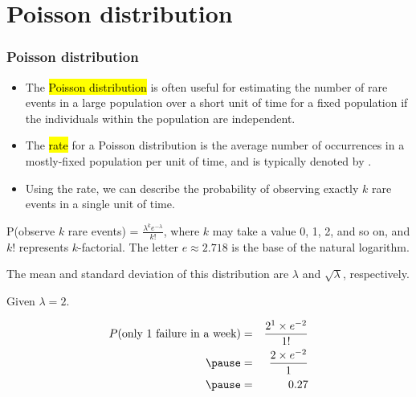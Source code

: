 
\section{Poisson distribution}


\begin{frame}
\frametitle{Poisson distribution}

\begin{itemize}

\item The \hl{Poisson distribution} is often useful for estimating the number of rare events in a large population over a short unit of time for a fixed population if the individuals within the population are independent.

\item The \hl{rate} for a Poisson distribution is the average number of occurrences in a mostly-fixed population per unit of time, and is typically denoted by \mathhl{\lambda}.

\item Using the rate, we can describe the probability of observing exactly $k$ rare events in a single unit of time.

\end{itemize}

\vfill

P(observe $k$ rare events) = $\frac{\lambda^k e^{-\lambda}}{k!}$,
where $k$ may take a value 0, 1, 2, and so on, and $k!$ represents $k$-factorial. The letter $e \approx 2.718$ is the base of the natural logarithm.

The mean and standard deviation of this distribution are $\lambda$ and $\sqrt{\lambda}$, respectively.

\end{frame}


\begin{frame}


\pause

Given $\lambda = 2$.

\pause

\begin{eqnarray*}
P(\text{only 1 failure in a week}) &=& \frac{2^1 \times e^{-2}}{1!} \\
\pause
&=& \frac{2 \times e^{-2}}{1} \\
\pause
&=& 0.27
\end{eqnarray*}

\end{frame}

